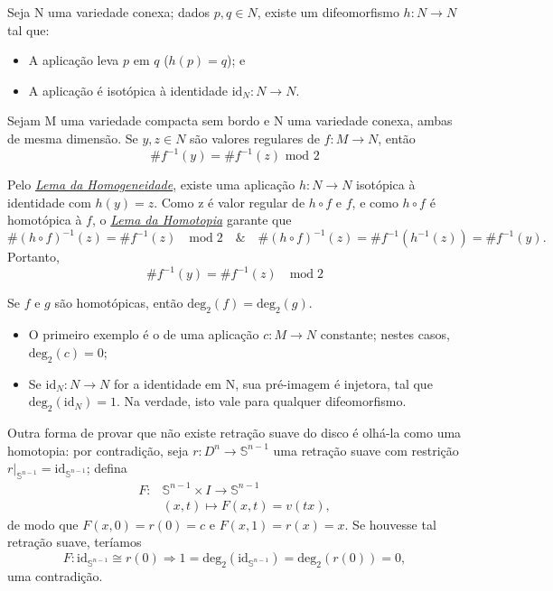 \documentclass[../differential_topology.tex]{subfiles}
\begin{document}
\hypertarget{homogeneity_lemma}{
	\begin{lemma*}
		Seja N uma variedade conexa; dados \(p, q\in N\), existe um difeomorfismo \(h:N\rightarrow N\) tal que:
		\begin{itemize}
			\item[i)] A aplicação leva \(p\) em \(q\) (\(h(p) = q\)); e
			\item[ii)] A aplicação é isotópica à identidade \(\mathrm{id}_{N}:N\rightarrow N\).
		\end{itemize}
	\end{lemma*}}

\begin{theorem*}
	Sejam M uma variedade compacta sem bordo e N uma variedade conexa, ambas de mesma dimensão. Se \(y, z\in N\) são valores regulares de \(f:M\rightarrow N\), então
	\[
		\# f^{-1}(y) = \# f^{-1}(z) \text{ mod 2}
	\]
\end{theorem*}
\begin{proof*}
	Pelo \hyperlink{homogeneity_lemma}{\textit{Lema da Homogeneidade}}, existe uma aplicação \(h:N\rightarrow N\) isotópica à identidade com \(h(y)=z\).
	Como z é valor regular de \(h\circ f\) e \(f\), e como \(h\circ f\) é homotópica à \(f\), o \hyperlink{homotopy_lemma}{\textit{Lema da Homotopia}} garante que
	\[
		\# (h\circ f)^{-1}(z) = \# f^{-1}(z)\quad \mathrm{mod}\;2 \quad\&\quad \# (h\circ f)^{-1}(z) = \#f^{-1}(h^{-1}(z))=\#f^{-1}(y).
	\]
	Portanto,
	\[
		\#f^{-1}(y) = \#f^{-1}(z) \quad \mathrm{mod}\;2
	\]
\end{proof*}
\begin{crl*}
	Se \(f\) e \(g\) são homotópicas, então \(\mathrm{deg}_{2}(f) = \mathrm{deg}_{2}(g)\).
\end{crl*}
\begin{example}
	\begin{itemize}
		\item[1)] O primeiro exemplo é o de uma aplicação \(c:M\rightarrow N\) constante; nestes casos, \(\mathrm{deg}_{2}(c) = 0\);
		\item[2)] Se \(\mathrm{id}_{N}:N\rightarrow N\) for a identidade em N, sua pré-imagem é injetora, tal que \(\mathrm{deg}_{2}(\mathrm{id}_{N}) = 1\). Na verdade, isto vale para qualquer difeomorfismo.
	\end{itemize}
\end{example}
\begin{example}
	Outra forma de provar que não existe retração suave do disco é olhá-la como uma homotopia: por contradição, seja \(r:D^{n}\rightarrow \mathbb{S}^{n-1}\) uma retração suave com restrição \(r|_{\mathbb{S}^{n-1}}=\mathrm{id}_{\mathbb{S}^{n-1}}\); defina
	\begin{align*}
		F: & \mathbb{S}^{n-1}\times I\rightarrow\mathbb{S}^{n-1} \\
		   & (x, t)\longmapsto F(x, t) = v(tx),
	\end{align*}
	de modo que \(F(x, 0) = r(0) = c\) e \(F(x, 1) = r(x) = x\). Se houvesse tal retração suave, teríamos
	\[
		F:\mathrm{id}_{\mathbb{S}^{n-1}}\cong r(0) \Rightarrow 1 = \mathrm{deg}_{2}(\mathrm{id}_{\mathbb{S}^{n-1}}) = \mathrm{deg}_{2}(r(0)) = 0,
	\]
	uma contradição.
\end{example}
\end{document}

